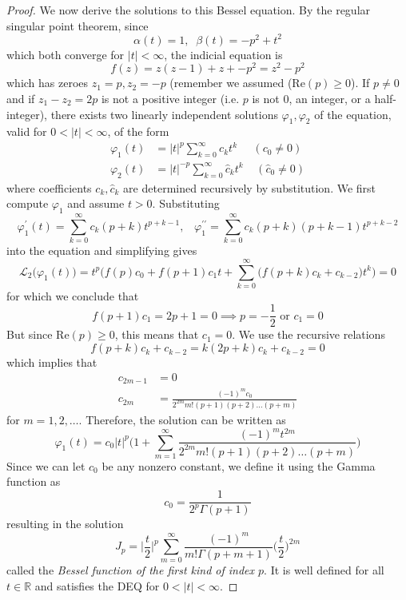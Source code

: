 \documentclass{article}
\theoremstyle{remark}
\theoremstyle{definition}
\begin{document}
      \begin{proof}
      We now derive the solutions to this Bessel equation. By the regular singular point theorem, since
      \[\alpha (t) = 1, \;\; \beta(t) = -p^2 + t^2\]
      which both converge for $|t|<\infty$, the indicial equation is 
      \[f(z) = z(z-1) + z + -p^2 = z^2 - p^2\]
      which has zeroes $z_1 = p, z_2 = -p$ (remember we assumed (Re$(p) \geq 0$). If $p \neq 0$ and if $z_1 - z_2 = 2p$ is not a positive integer (i.e. $p$ is not $0$, an integer, or a half-integer), there exists two linearly independent solutions $\varphi_1, \varphi_2$ of the equation, valid for $0<|t|<\infty$, of the form
      \begin{align*}
          \varphi_1 (t) & = |t|^p \sum_{k=0}^\infty c_k t^k \;\;\;\;\; (c_0 \neq 0) \\
          \varphi_2 (t) & = |t|^{-p} \sum_{k=0}^\infty \hat{c}_k t^k \;\;\;\; (\hat{c}_0 \neq 0)
      \end{align*}
      where coefficients $c_k, \hat{c}_k$ are determined recursively by substitution. We first compute $\varphi_1$ and assume $t>0$. Substituting
      \[\varphi_1^\prime (t) = \sum_{k=0}^\infty c_k (p+k) t^{p+k-1}, \;\;\; \varphi_1^{\prime\prime} = \sum_{k=0}^\infty c_k (p+k) (p+k-1) t^{p+k-2}\]
      into the equation and simplifying gives
      \[\mathcal{L}_2 \big( \varphi_1 (t)\big) = t^p \bigg( f(p) c_0 + f(p+1) c_1 t + \sum_{k=0}^\infty \big( f(p+k) c_k + c_{k-2}\big) t^k \bigg) = 0\]
      for which we conclude that 
      \[f(p+1) c_1 = 2p + 1 = 0 \implies p = -\frac{1}{2} \text{ or } c_1 = 0\]
      But since Re$(p)\geq 0$, this means that $c_1 = 0$. We use the recursive relations
      \[f(p+k) c_k + c_{k-2} = k (2p+k) c_k + c_{k-2} = 0\]
      which implies that
      \begin{align*}
          c_{2m-1} & = 0 \\
          c_{2m} & = \frac{(-1)^m c_0}{2^{2m} m! (p+1)(p+2) \ldots (p+m)} 
      \end{align*}
      for $m = 1, 2, \ldots$. Therefore, the solution can be written as
      \[\varphi_1 (t) = c_0 |t|^p \Bigg( 1 + \sum_{m=1}^\infty \frac{(-1)^m t^{2m}}{2^{2m} m! (p+1) (p+2) \ldots (p+m)} \Bigg)\]
      Since we can let $c_0$ be any nonzero constant, we define it using the Gamma function as
      \[c_0 = \frac{1}{2^p \Gamma(p+1)}\]
      resulting in the solution
      \[J_p = \bigg| \frac{t}{2}\bigg|^p \sum_{m=0}^\infty \frac{(-1)^m}{m! \Gamma(p+m+1)} \bigg(\frac{t}{2}\bigg)^{2m}\]
      called the \textit{Bessel function of the first kind of index $p$}. It is well defined for all $t \in \mathbb{R}$ and satisfies the DEQ for $0 < |t| < \infty$. 
      \end{proof}
\end{document}
